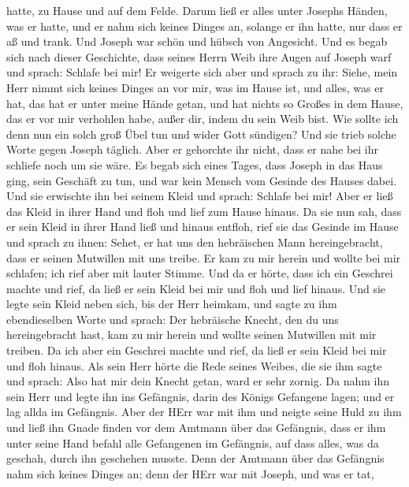 hatte, zu Hause und auf dem Felde.  Darum ließ er alles
unter Josephs Händen, was er hatte, und er nahm sich keines Dinges an,
solange er ihn hatte, nur dass er aß und trank. Und Joseph war schön und
hübsch von Angesicht.  Und es begab sich nach dieser
Geschichte, dass seines Herrn Weib ihre Augen auf Joseph warf und
sprach: Schlafe bei mir!  Er weigerte sich aber und sprach
zu ihr: Siehe, mein Herr nimmt sich keines Dinges an vor mir, was im
Hause ist, und alles, was er hat, das hat er unter meine Hände getan,
 und hat nichts so Großes in dem Hause, das er vor mir
verhohlen habe, außer dir, indem du sein Weib bist. Wie sollte ich denn
nun ein solch groß Übel tun und wider Gott sündigen?  Und
sie trieb solche Worte gegen Joseph täglich. Aber er gehorchte ihr
nicht, dass er nahe bei ihr schliefe noch um sie wäre.  Es
begab sich eines Tages, dass Joseph in das Haus ging, sein Geschäft zu
tun, und war kein Mensch vom Gesinde des Hauses dabei.  Und
sie erwischte ihn bei seinem Kleid und sprach: Schlafe bei mir! Aber er
ließ das Kleid in ihrer Hand und floh und lief zum Hause hinaus.
 Da sie nun sah, dass er sein Kleid in ihrer Hand ließ und
hinaus entfloh,  rief sie das Gesinde im Hause und sprach
zu ihnen: Sehet, er hat uns den hebräischen Mann hereingebracht, dass er
seinen Mutwillen mit uns treibe. Er kam zu mir herein und wollte bei mir
schlafen; ich rief aber mit lauter Stimme.  Und da er
hörte, dass ich ein Geschrei machte und rief, da ließ er sein Kleid bei
mir und floh und lief hinaus.  Und sie legte sein Kleid
neben sich, bis der Herr heimkam,  und sagte zu ihm
ebendieselben Worte und sprach: Der hebräische Knecht, den du uns
hereingebracht hast, kam zu mir herein und wollte seinen Mutwillen mit
mir treiben.  Da ich aber ein Geschrei machte und rief, da
ließ er sein Kleid bei mir und floh hinaus.  Als sein Herr
hörte die Rede seines Weibes, die sie ihm sagte und sprach: Also hat mir
dein Knecht getan, ward er sehr zornig.  Da nahm ihn sein
Herr und legte ihn ins Gefängnis, darin des Königs Gefangene lagen; und
er lag allda im Gefängnis.  Aber der HErr war mit ihm und
neigte seine Huld zu ihm und ließ ihn Gnade finden vor dem Amtmann über
das Gefängnis,  dass er ihm unter seine Hand befahl alle
Gefangenen im Gefängnis, auf dass alles, was da geschah, durch ihn
geschehen musste.  Denn der Amtmann über das Gefängnis nahm
sich keines Dinges an; denn der HErr war mit Joseph, und was er tat,
